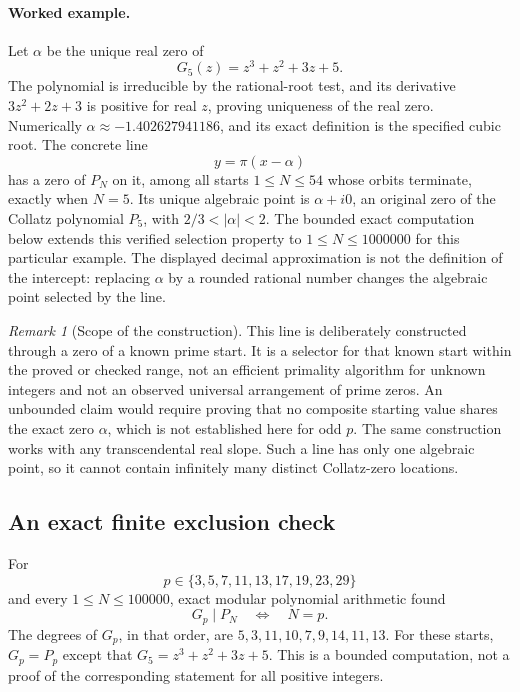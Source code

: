 \documentclass[11pt,a4paper]{article}
\theoremstyle{definition}
\theoremstyle{remark}
\newtheorem{remark}[theorem]{Remark}
\numberwithin{equation}{section}
\begin{document}
\paragraph{Worked example.}
Let $\alpha$ be the unique real zero of
\[
 G_5(z)=z^3+z^2+3z+5.
\]
The polynomial is irreducible by the rational-root test, and its derivative
$3z^2+2z+3$ is positive for real $z$, proving uniqueness of the real zero.
Numerically $\alpha\approx-1.402627941186$, and its exact definition is the
specified cubic root. The concrete line
\[
 \boxed{\ y=\pi(x-\alpha)\ }
\]
has a zero of $P_N$ on it, among all starts $1\leq N\leq54$ whose orbits
terminate, exactly when $N=5$. Its unique algebraic point is
$\alpha+i0$, an original zero of the Collatz polynomial $P_5$, with
$2/3<|\alpha|<2$. The bounded exact computation below extends this verified
selection property to $1\leq N\leq1000000$ for this particular example.
The displayed decimal approximation is not the definition of the intercept:
replacing $\alpha$ by a rounded rational number changes the algebraic point
selected by the line.

\begin{remark}[Scope of the construction]
This line is deliberately constructed through a zero of a known prime
start. It is a selector for that known start within the proved or checked
range, not an efficient primality algorithm for unknown integers and not
an observed universal arrangement of prime zeros. An unbounded claim would
require proving that no composite starting value shares the exact zero
$\alpha$, which is not established here for odd $p$.
The same construction works with any transcendental real slope.
Such a line has only one algebraic point, so it cannot contain infinitely
many distinct Collatz-zero locations.
\end{remark}

\subsection{An exact finite exclusion check}

For
\[
 p\in\{3,5,7,11,13,17,19,23,29\}
\]
and every $1\leq N\leq100000$, exact modular polynomial arithmetic found
\[
 G_p\mid P_N\quad\Longleftrightarrow\quad N=p.
\]
The degrees of $G_p$, in that order, are $5,3,11,10,7,9,14,11,13$.
For these starts, $G_p=P_p$ except that
$G_5=z^3+z^2+3z+5$.
This is a bounded computation, not a proof of the corresponding statement
for all positive integers.
\end{document}

